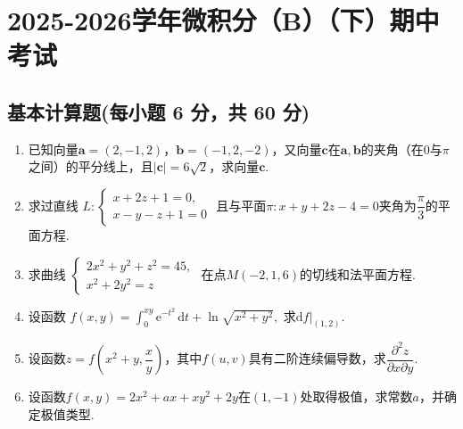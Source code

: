 \documentclass[../main.tex]{subfiles}
\begin{document}
\chapter{2025-2026学年微积分（B）（下）期中考试}

\section{基本计算题(每小题 6 分，共 60 分)}
\begin{enumerate}
    \item 已知向量$\boldsymbol{a}=(2,-1,2)$，$\boldsymbol{b}=(-1,2,-2)$，又向量$\boldsymbol{c}$在$\boldsymbol{a},\boldsymbol{b}$的夹角（在$0$与$\pi$之间）的平分线上，且$|\boldsymbol{c}|=6\sqrt2$，求向量$\boldsymbol{c}$.
          \vspace{9em}

    \item 求过直线
          \(
          L:\begin{cases}
              x+2z+1=0, \\
              x-y-z+1=0
          \end{cases}
          \)
          且与平面$\pi:x+y+2z-4=0$夹角为$\dfrac{\pi}{3}$的平面方程.
          \vspace{10em}

    \item 求曲线
          \(
          \begin{cases}
              2x^2+y^2+z^2=45, \\
              x^2+2y^2=z
          \end{cases}
          \)
          在点$M(-2,1,6)$的切线和法平面方程.
          \vspace{10em}

    \item 设函数
          \(
          f(x,y)=\int_0^{xy}\mathrm{e}^{-t^2}\,\mathrm{d}t+\ln\sqrt{x^2+y^2},
          \)
          求$\mathrm{d}f|_{(1,2)}$.
          \vspace{9em}

    \item 设函数$z=f\left(x^2+y,\dfrac{x}{y}\right)$，其中$f(u,v)$具有二阶连续偏导数，求$\dfrac{\partial^2z}{\partial x\partial y}$.
          \vspace{10em}

    \item 设函数$f(x,y)=2x^2+ax+xy^2+2y$在$(1,-1)$处取得极值，求常数$a$，并确定极值类型.
          \vspace{9em}


\end{enumerate}
\end{document}

